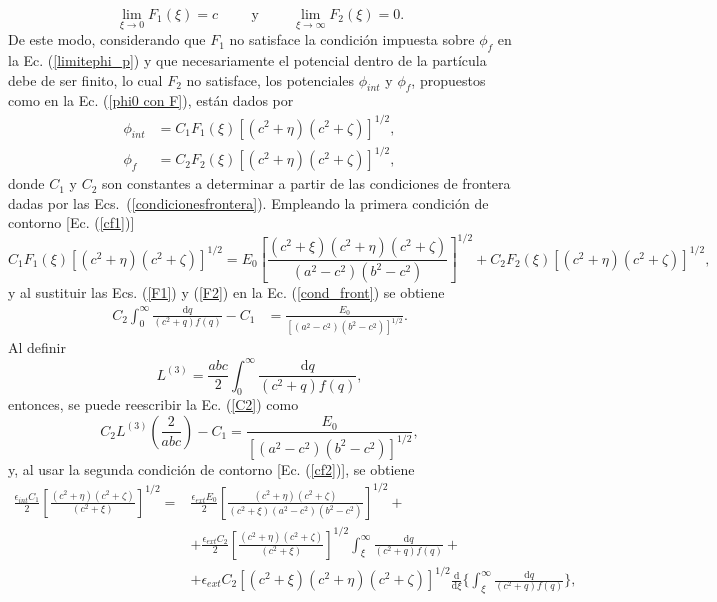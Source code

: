 \begin{equation}
    \lim_{\xi \to 0}F_1(\xi)=c\hspace{1cm}\mbox{y}\hspace{1cm} \lim_{\xi \to \infty}F_2(\xi)=0.
\end{equation}
De este modo, considerando que $F_1$ no satisface la condición impuesta sobre $\phi_f$ en la Ec. (\ref{limitephi_p}) y que necesariamente el potencial dentro de la partícula debe de ser finito, lo cual $F_2$ no satisface, los potenciales $\phi_{int}$ y $\phi_f$, propuestos como en la Ec. (\ref{phi0 con F}), están dados por
\begin{align}
    \phi_{int}&=C_1F_1(\xi)[(c^2+\eta)(c^2+\zeta)]^{1/2}\label{phi_int},\\
    \phi_f&=C_2F_2(\xi)[(c^2+\eta)(c^2+\zeta)]^{1/2}\label{phi_p},
\end{align}
donde $C_1$ y $C_2$ son constantes a determinar a partir de las condiciones de frontera dadas por las Ecs.~(\ref{condicionesfrontera}). Empleando la primera condición de contorno [Ec. (\ref{cf1})]
\begin{equation}
    C_1F_1(\xi)[(c^2+\eta)(c^2+\zeta)]^{1/2}=E_0\left[\frac{(c^2+\xi)(c^2+\eta)(c^2+\zeta)}{(a^2-c^2)(b^2-c^2)}\right]^{1/2}+C_2F_2(\xi)[(c^2+\eta)(c^2+\zeta)]^{1/2},
    \label{cond_front}
\end{equation}
y al sustituir las Ecs. (\ref{F1}) y (\ref{F2}) en la Ec. (\ref{cond_front}) se obtiene
\begin{align}
    C_2 \int_{0}^{\infty}\frac{\text{d}q}{(c^2+q)f(q)}-C_1&=\frac{E_0}{[(a^2-c^2)(b^2-c^2)]^{1/2}}.
    \label{C2}
\end{align}
Al definir
\begin{equation}
    L^{(3)}=\frac{abc}{2}\int_{0}^{\infty}\frac{\text{d}q}{(c^2+q)f(q)},
\end{equation}
entonces, se puede reescribir la Ec. (\ref{C2}) como
\begin{equation}
    C_2L^{(3)}\left(\frac{2}{abc}\right)-C_1=\frac{E_0}{[(a^2-c^2)(b^2-c^2)]^{1/2}},
    \label{ec1 de cf}
\end{equation}
y, al usar la segunda condición de contorno [Ec. (\ref{cf2})], se obtiene
\begin{align*}
	\frac{\epsilon_{int} C_1}{2}\left[\frac{(c^2+\eta)(c^2+\zeta)}{(c^2+\xi)}\right]^{1/2} 
	= &\frac{\epsilon_{ext} E_0}{2}\left[\frac{(c^2+\eta)(c^2+\zeta)}{(c^2+\xi)(a^2-c^2)(b^2-c^2)}\right]^{1/2} +\\
	&+ \frac{\epsilon_{ext} C_2}{2}\left[\frac{(c^2+\eta)(c^2+\zeta)}{(c^2+\xi)}\right]^{1/2}
	\int_{\xi}^{\infty}\frac{\text{d}q}{(c^2+q)f(q)}+ \\
	&+ \epsilon_{ext} C_2[(c^2+\xi)(c^2+\eta)(c^2+\zeta)]^{1/2}
	\frac{\text{d}}{\text{d}\xi} \Bigg\{\int_{\xi}^{\infty}\frac{\text{d}q}{(c^2+q)f(q)}\Bigg\},
\end{align*}
